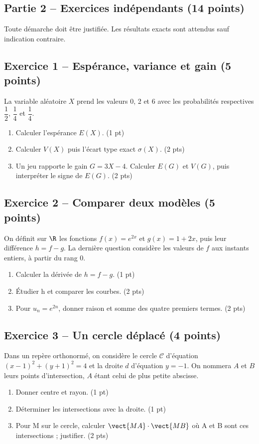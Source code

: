 \mxnewpage\subsection*{Partie 2 -- Exercices indépendants (14 points)}
Toute démarche doit être justifiée. Les résultats exacts sont attendus sauf indication contraire.
\subsection*{Exercice 1 -- Espérance, variance et gain (5 points)}
La variable aléatoire $X$ prend les valeurs 0, 2 et 6 avec les probabilités respectives $\dfrac12$, $\dfrac14$ et $\dfrac14$.
\begin{enumerate}
\item Calculer l’espérance $E(X)$. \hfill(1 pt)
\item Calculer $V(X)$ puis l’écart type exact $\sigma(X)$. \hfill(2 pts)
\item Un jeu rapporte le gain $G=3X-4$. Calculer $E(G)$ et $V(G)$, puis interpréter le signe de $E(G)$. \hfill(2 pts)
\end{enumerate}
\subsection*{Exercice 2 -- Comparer deux modèles (5 points)}
On définit sur $\R$ les fonctions $f(x)=e^{2x}$ et $g(x)=1+2x$, puis leur différence $h=f-g$. La dernière question considère les valeurs de $f$ aux instants entiers, à partir du rang 0.
\begin{enumerate}
\item Calculer la dérivée de $h=f-g$. \hfill(1 pt)
\item Étudier h et comparer les courbes. \hfill(2 pts)
\item Pour $u_n=e^{2n}$, donner raison et somme des quatre premiers termes. \hfill(2 pts)
\end{enumerate}
\subsection*{Exercice 3 -- Un cercle déplacé (4 points)}
Dans un repère orthonormé, on considère le cercle $\mathcal C$ d’équation $(x-1)^2+(y+1)^2=4$ et la droite $d$ d’équation $y=-1$. On nommera $A$ et $B$ leurs points d’intersection, $A$ étant celui de plus petite abscisse.
\begin{enumerate}
\item Donner centre et rayon. \hfill(1 pt)
\item Déterminer les intersections avec la droite. \hfill(1 pt)
\item Pour M sur le cercle, calculer $\vect{MA}\cdot\vect{MB}$ où A et B sont ces intersections ; justifier. \hfill(2 pts)
\end{enumerate}
